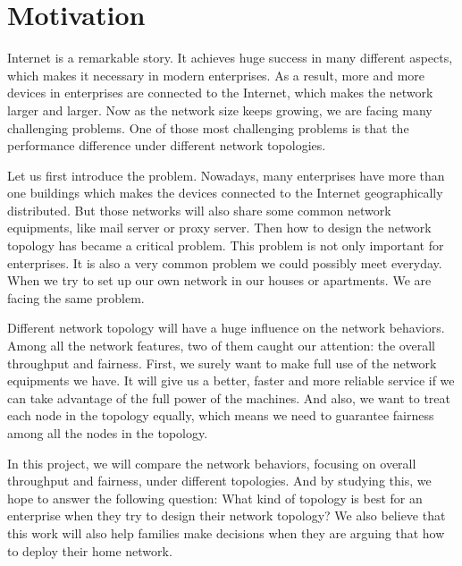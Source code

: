 \section{Motivation} \label{sec:motivation}

Internet is a remarkable story. It achieves huge success in many different aspects, 
which makes it necessary in modern enterprises.
As a result, more and more devices in enterprises are connected to the Internet, 
which makes the network larger and larger. Now as the network size keeps growing, 
we are facing many challenging problems.
One of those most challenging problems is 
that the performance difference under different network topologies.

Let us first introduce the problem.
Nowadays, many enterprises have more than one buildings 
which makes the devices connected to the Internet geographically distributed. 
But those networks will also share some common network equipments, 
like mail server or proxy server. 
Then how to design the network topology has became a critical problem. 
This problem is not only important for enterprises. 
It is also a very common problem we could possibly meet everyday. 
When we try to set up our own network in our houses or apartments. 
We are facing the same problem.

Different network topology will have a huge influence on the network behaviors. 
Among all the network features, two of them caught our attention: 
the overall throughput and fairness. 
First, we surely want to make full use of the network equipments we have. 
It will give us a better, faster and more reliable service 
if we can take advantage of the full power of the machines. 
And also, we want to treat each node in the topology equally, 
which means we need to guarantee fairness among all the nodes in the topology.
 
In this project, we will compare the network behaviors, 
focusing on overall throughput and fairness, under different topologies. 
And by studying this, we hope to answer the following question: 
What kind of topology is best for an enterprise when they try to design their network topology? 
We also believe that this work will also help families make decisions 
when they are arguing that how to deploy their home network.

